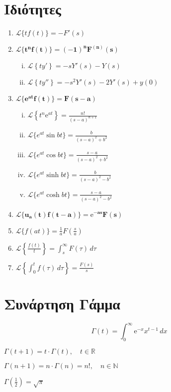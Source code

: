 \documentclass[a4paper,table]{report}
\begin{document}
{  \section*{Ιδιότητες}
  \begin{enumerate}
    \item $ \mathcal{L}\{tf(t)\} = -F'(s) $
    \item $ \bm{\mathcal{L}\{t^{n}f(t)\} = (-1)^{n} F^{(n)}(s)} $
      \begin{enumerate}[i)]
        \item $ \mathcal{L}\left\{ty'\right\} = -sY'(s)-Y(s) $ 
        \item $ \mathcal{L}\left\{ty''\right\} = -s^{2}Y'(s)-2Y'(s)+y(0) $ 
      \end{enumerate}
    \item $ \bm{\mathcal{L}\{e^{at}f(t)\} = F(s-a)}$
      \begin{enumerate}[i)]
        \item $ \mathcal{L}\left\{t^{n} \mathrm{e}^{at}\right\}=\frac{n!}{(s-a)^{n+1}} $
        \item $ \mathcal{L}\{e^{at} \sin{bt}\} = \frac{b}{(s-a)^{2}+b^{2}}$
        \item $ \mathcal{L}\{e^{at} \cos{bt}\} = \frac{s-a}{(s-a)^{2}+b^{2}}$
        \item $ \mathcal{L}\{e^{at} \sinh{bt}\} = \frac{b}{(s-a)^{2}-b^{2}}$
        \item $ \mathcal{L}\{e^{at} \cosh{bt}\} = \frac{s-a}{(s-a)^{2}-b^{2}}$
      \end{enumerate}
    \item $ \bm{\mathcal{L}\{u_{a}(t)f(t-a)\} = \mathrm{e}^{-as}F(s)}$
    \item $ \mathcal{L}\{f(at)\} = \frac{1}{a} F\left(\frac{s}{a}\right) $
    \item $ \mathcal{L}\left\{\frac{f(t)}{t} \right\} = \int\nolimits _{s}^{\infty} 
      F(\tau) \,{d\tau} $
    \item $ \mathcal{L}\left\{\int\nolimits _{0}^{t} f(\tau) \,{d\tau}\right\} = 
      \frac{F(s)}{s} $
  \end{enumerate}
  \section*{Συνάρτηση Γάμμα}
  \[
    \boxed{\Gamma (t) = \int _{0}^{\infty} \mathrm{e}^{-x} x^{t-1} \,{dx}}
  \] 
  \begin{myitemize}
    \item $\Gamma (t+1) = t \cdot \Gamma (t), \quad t \in \mathbb{R} $
    \item $\Gamma (n+1) = n \cdot \Gamma (n) = n!, \quad n \in \mathbb{N}$
    \item $\Gamma \left(\frac{1}{2}\right) = \sqrt{\pi}$
  \end{myitemize}
}
\end{document}
